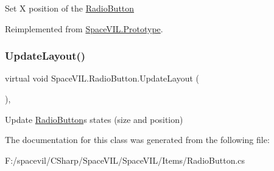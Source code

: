 Set X position of the \mbox{\hyperlink{class_space_v_i_l_1_1_radio_button}{Radio\+Button}} 



Reimplemented from \mbox{\hyperlink{class_space_v_i_l_1_1_prototype}{Space\+V\+I\+L.\+Prototype}}.

\mbox{\label{class_space_v_i_l_1_1_radio_button_a899b3a81136fe60e0ad2b1aace9db40c}} 
\subsubsection{\texorpdfstring{Update\+Layout()}{UpdateLayout()}}
{\footnotesize\ttfamily virtual void Space\+V\+I\+L.\+Radio\+Button.\+Update\+Layout (\begin{DoxyParamCaption}{ }\end{DoxyParamCaption})\hspace{0.3cm}{\ttfamily [inline]}, {\ttfamily [virtual]}}



Update \mbox{\hyperlink{class_space_v_i_l_1_1_radio_button}{Radio\+Button}}\textquotesingle{}s states (size and position) 



The documentation for this class was generated from the following file\+:\begin{DoxyCompactItemize}
\item 
F\+:/spacevil/\+C\+Sharp/\+Space\+V\+I\+L/\+Space\+V\+I\+L/\+Items/Radio\+Button.\+cs\end{DoxyCompactItemize}
